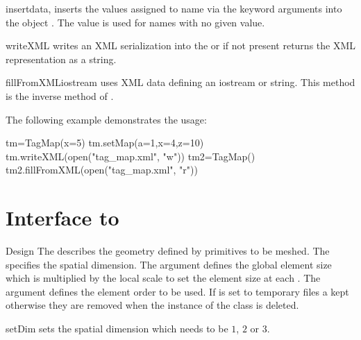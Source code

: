 \begin{methoddesc}[TagMap]{insert}{data,}
inserts the values assigned to name via the keyword arguments  
into the \Data object . The value  is used for names with no given value.
\end{methoddesc}

\begin{methoddesc}[TagMap]{writeXML}{}
writes an XML serialization into the  or if not present returns the XML representation
as a string.
\end{methoddesc}

\begin{methoddesc}[TagMap]{fillFromXML}{iostream}
uses XML data  defining an iostream or string. This method is the
inverse method of .

The following example demonstrates the usage:
\begin{python}
tm=TagMap(x=5)
tm.setMap(a=1,x=4,z=10)
tm.writeXML(open("tag_map.xml", "w"))
tm2=TagMap()
tm2.fillFromXML(open("tag_map.xml", "r"))
\end{python}  
\end{methoddesc}         



\section{Interface to \gmshextern}

\begin{classdesc}{Design}{
}
The  describes the geometry defined by primitives to be meshed.
The  specifies the spatial dimension. The argument  defines the global
element size which is multiplied by the local scale to set the element size at each \Point. 
The argument  defines the element order to be used. If  is set to 
\True temporary files a kept otherwise they are removed when the instance of the class is deleted. 
\end{classdesc}


\begin{methoddesc}[Design]{setDim}{}
sets the spatial dimension which needs to be $1$, $2$ or $3$.
\end{methoddesc}

